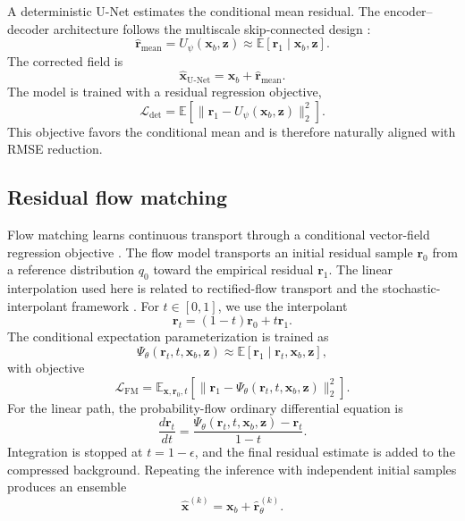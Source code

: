 \documentclass[11pt]{article}
\newcommand{\x}{\mathbf{x}}
\newcommand{\xb}{\mathbf{x}_{b}}
\newcommand{\xh}{\widehat{\mathbf{x}}}
\newcommand{\z}{\mathbf{z}}
\newcommand{\rzero}{\mathbf{r}_{0}}
\newcommand{\rone}{\mathbf{r}_{1}}
\newcommand{\rtau}{\mathbf{r}_{t}}
\newcommand{\rh}{\widehat{\mathbf{r}}_{\theta}}
\newcommand{\emean}{\widehat{\mathbf{r}}_{\mathrm{mean}}}
\newcommand{\Psit}{\Psi_{\theta}}
\newcommand{\Ut}{U_{\psi}}
\newcommand{\Lcal}{\mathcal{L}}
\begin{document}
A deterministic U-Net estimates the conditional mean residual. The encoder--decoder architecture follows the multiscale skip-connected design \cite{ronneberger2015u}:
\begin{equation}
\boxed{
    \emean
    =
    \Ut(\xb,\z)
    \approx
    \mathbb{E}[\rone\mid\xb,\z].
}
\label{eq:det_mean}
\end{equation}
The corrected field is
\begin{equation}
    \xh_{\mathrm{U\mbox{-}Net}}
    =
    \xb+\emean.
\end{equation}
The model is trained with a residual regression objective,
\begin{equation}
    \Lcal_{\mathrm{det}}
    =
    \mathbb{E}
    \left[
    \|\rone-\Ut(\xb,\z)\|_2^2
    \right].
\end{equation}
This objective favors the conditional mean and is therefore naturally aligned with RMSE reduction.

\subsection{Residual flow matching}

Flow matching learns continuous transport through a conditional vector-field regression objective \cite{lipman2022flow}. The flow model transports an initial residual sample $\rzero$ from a reference distribution $q_0$ toward the empirical residual $\rone$. The linear interpolation used here is related to rectified-flow transport \cite{liu2022flow} and the stochastic-interpolant framework \cite{albergo2022building}. For $t\in[0,1]$, we use the interpolant
\begin{equation}
\boxed{
    \rtau=(1-t)\rzero+t\rone.
}
\label{eq:linear_interpolant}
\end{equation}
The conditional expectation parameterization is trained as
\begin{equation}
\boxed{
    \Psit(\rtau,t,\xb,\z)
    \approx
    \mathbb{E}[\rone\mid\rtau,\xb,\z],
}
\end{equation}
with objective
\begin{equation}
\boxed{
    \Lcal_{\mathrm{FM}}
    =
    \mathbb{E}_{\x,\rzero,t}
    \left[
    \|\rone-\Psit(\rtau,t,\xb,\z)\|_2^2
    \right].
}
\label{eq:fm_loss}
\end{equation}
For the linear path, the probability-flow ordinary differential equation is
\begin{equation}
    \frac{d\rtau}{dt}
    =
    \frac{\Psit(\rtau,t,\xb,\z)-\rtau}{1-t}.
\end{equation}
Integration is stopped at $t=1-\epsilon$, and the final residual estimate is added to the compressed background. Repeating the inference with independent initial samples produces an ensemble
\begin{equation}
    \xh^{(k)}=\xb+\rh^{(k)}.
\end{equation}
\end{document}
